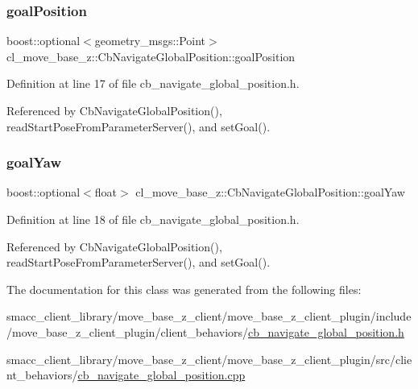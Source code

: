 \subsubsection{\texorpdfstring{goal\+Position}{goalPosition}}
{\footnotesize\ttfamily boost\+::optional$<$geometry\+\_\+msgs\+::\+Point$>$ cl\+\_\+move\+\_\+base\+\_\+z\+::\+Cb\+Navigate\+Global\+Position\+::goal\+Position}



Definition at line 17 of file cb\+\_\+navigate\+\_\+global\+\_\+position.\+h.



Referenced by Cb\+Navigate\+Global\+Position(), read\+Start\+Pose\+From\+Parameter\+Server(), and set\+Goal().

\mbox{\label{classcl__move__base__z_1_1CbNavigateGlobalPosition_a839900de7f664b27c9be189fadbaa003}} 
\subsubsection{\texorpdfstring{goal\+Yaw}{goalYaw}}
{\footnotesize\ttfamily boost\+::optional$<$float$>$ cl\+\_\+move\+\_\+base\+\_\+z\+::\+Cb\+Navigate\+Global\+Position\+::goal\+Yaw}



Definition at line 18 of file cb\+\_\+navigate\+\_\+global\+\_\+position.\+h.



Referenced by Cb\+Navigate\+Global\+Position(), read\+Start\+Pose\+From\+Parameter\+Server(), and set\+Goal().



The documentation for this class was generated from the following files\+:\begin{DoxyCompactItemize}
\item 
smacc\+\_\+client\+\_\+library/move\+\_\+base\+\_\+z\+\_\+client/move\+\_\+base\+\_\+z\+\_\+client\+\_\+plugin/include/move\+\_\+base\+\_\+z\+\_\+client\+\_\+plugin/client\+\_\+behaviors/\hyperlink{cb__navigate__global__position_8h}{cb\+\_\+navigate\+\_\+global\+\_\+position.\+h}\item 
smacc\+\_\+client\+\_\+library/move\+\_\+base\+\_\+z\+\_\+client/move\+\_\+base\+\_\+z\+\_\+client\+\_\+plugin/src/client\+\_\+behaviors/\hyperlink{cb__navigate__global__position_8cpp}{cb\+\_\+navigate\+\_\+global\+\_\+position.\+cpp}\end{DoxyCompactItemize}
